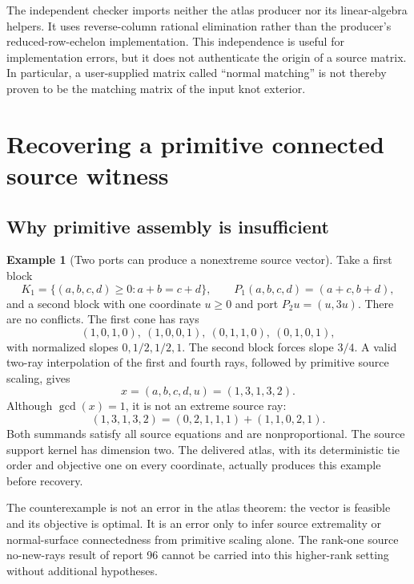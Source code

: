 \documentclass[11pt,a4paper]{article}
\theoremstyle{definition}
\newtheorem{example}[theorem]{Example}
\theoremstyle{remark}
\begin{document}
The independent checker imports neither the atlas producer nor its linear-algebra helpers. It uses reverse-column rational elimination rather than the producer's reduced-row-echelon implementation. This independence is useful for implementation errors, but it does not authenticate the origin of a source matrix. In particular, a user-supplied matrix called ``normal matching'' is not thereby proven to be the matching matrix of the input knot exterior.

\section{Recovering a primitive connected source witness}
\label{sec:witness}

\subsection{Why primitive assembly is insufficient}
\begin{example}[Two ports can produce a nonextreme source vector]
\label{ex:nonextreme}
Take a first block
\[
 K_1=\{(a,b,c,d)\ge0:a+b=c+d\},\qquad P_1(a,b,c,d)=(a+c,b+d),
\]
and a second block with one coordinate $u\ge0$ and port $P_2u=(u,3u)$. There are no conflicts. The first cone has rays
\[
 (1,0,1,0),\ (1,0,0,1),\ (0,1,1,0),\ (0,1,0,1),
\]
with normalized slopes $0,1/2,1/2,1$. The second block forces slope $3/4$. A valid two-ray interpolation of the first and fourth rays, followed by primitive source scaling, gives
\[
 x=(a,b,c,d,u)=(1,3,1,3,2).
\]
Although $\gcd(x)=1$, it is not an extreme source ray:
\begin{equation}
 (1,3,1,3,2)=(0,2,1,1,1)+(1,1,0,2,1).
 \label{eq:nonextreme-sum}
\end{equation}
Both summands satisfy all source equations and are nonproportional. The source support kernel has dimension two. The delivered atlas, with its deterministic tie order and objective one on every coordinate, actually produces this example before recovery.
\end{example}

The counterexample is not an error in the atlas theorem: the vector is feasible and its objective is optimal. It is an error only to infer source extremality or normal-surface connectedness from primitive scaling alone. The rank-one source no-new-rays result of report 96 cannot be carried into this higher-rank setting without additional hypotheses.
\end{document}
